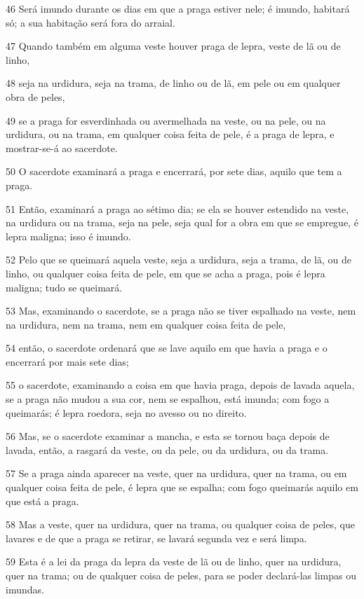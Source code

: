 \par 46 Será imundo durante os dias em que a praga estiver nele; é imundo, habitará só; a sua habitação será fora do arraial.
\par 47 Quando também em alguma veste houver praga de lepra, veste de lã ou de linho,
\par 48 seja na urdidura, seja na trama, de linho ou de lã, em pele ou em qualquer obra de peles,
\par 49 se a praga for esverdinhada ou avermelhada na veste, ou na pele, ou na urdidura, ou na trama, em qualquer coisa feita de pele, é a praga de lepra, e mostrar-se-á ao sacerdote.
\par 50 O sacerdote examinará a praga e encerrará, por sete dias, aquilo que tem a praga.
\par 51 Então, examinará a praga ao sétimo dia; se ela se houver estendido na veste, na urdidura ou na trama, seja na pele, seja qual for a obra em que se empregue, é lepra maligna; isso é imundo.
\par 52 Pelo que se queimará aquela veste, seja a urdidura, seja a trama, de lã, ou de linho, ou qualquer coisa feita de pele, em que se acha a praga, pois é lepra maligna; tudo se queimará.
\par 53 Mas, examinando o sacerdote, se a praga não se tiver espalhado na veste, nem na urdidura, nem na trama, nem em qualquer coisa feita de pele,
\par 54 então, o sacerdote ordenará que se lave aquilo em que havia a praga e o encerrará por mais sete dias;
\par 55 o sacerdote, examinando a coisa em que havia praga, depois de lavada aquela, se a praga não mudou a sua cor, nem se espalhou, está imunda; com fogo a queimarás; é lepra roedora, seja no avesso ou no direito.
\par 56 Mas, se o sacerdote examinar a mancha, e esta se tornou baça depois de lavada, então, a rasgará da veste, ou da pele, ou da urdidura, ou da trama.
\par 57 Se a praga ainda aparecer na veste, quer na urdidura, quer na trama, ou em qualquer coisa feita de pele, é lepra que se espalha; com fogo queimarás aquilo em que está a praga.
\par 58 Mas a veste, quer na urdidura, quer na trama, ou qualquer coisa de peles, que lavares e de que a praga se retirar, se lavará segunda vez e será limpa.
\par 59 Esta é a lei da praga da lepra da veste de lã ou de linho, quer na urdidura, quer na trama; ou de qualquer coisa de peles, para se poder declará-las limpas ou imundas.


